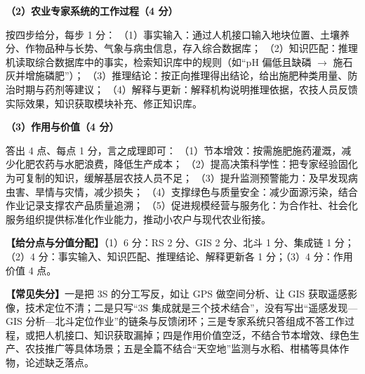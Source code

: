 \documentclass[a4paper,11pt]{article}
\begin{document}
\textbf{（2）农业专家系统的工作过程（4 分）}
\begin{analysis}
按四步给分，每步 1 分：
（1）事实输入：通过人机接口输入地块位置、土壤养分、作物品种与长势、气象与病虫信息，存入综合数据库；
（2）知识匹配：推理机读取综合数据库中的事实，检索知识库中的规则（如“pH 偏低且缺磷 $\rightarrow$ 施石灰并增施磷肥”）；
（3）推理结论：按正向推理得出结论，给出施肥种类用量、防治时期与药剂等建议；
（4）解释与更新：解释机构说明推理依据，农技人员反馈实际效果，知识获取模块补充、修正知识库。
\end{analysis}

\textbf{（3）作用与价值（4 分）}
\begin{analysis}
答出 4 点、每点 1 分，言之成理即可：
（1）节本增效：按需施肥施药灌溉，减少化肥农药与水肥浪费，降低生产成本；
（2）提高决策科学性：把专家经验固化为可复制的知识，缓解基层农技人员不足；
（3）提升监测预警能力：及早发现病虫害、旱情与灾情，减少损失；
（4）支撑绿色与质量安全：减少面源污染，结合作业记录支撑农产品质量追溯；
（5）促进规模经营与服务化：为合作社、社会化服务组织提供标准化作业能力，推动小农户与现代农业衔接。
\end{analysis}

\textbf{【给分点与分值分配】}（1）6 分：RS 2 分、GIS 2 分、北斗 1 分、集成链 1 分；（2）4 分：事实输入、知识匹配、推理结论、解释更新各 1 分；（3）4 分：作用价值 4 点。

\textbf{【常见失分】}一是把 3S 的分工写反，如让 GPS 做空间分析、让 GIS 获取遥感影像，技术定位不清；二是只写“3S 集成就是三个技术结合”，没有写出“遥感发现—GIS 分析—北斗定位作业”的链条与反馈闭环；三是专家系统只答组成不答工作过程，或把人机接口、知识获取漏掉；四是作用价值空泛，不结合节本增效、绿色生产、农技推广等具体场景；五是全篇不结合“天空地”监测与水稻、柑橘等具体作物，论述缺乏落点。
\end{document}

